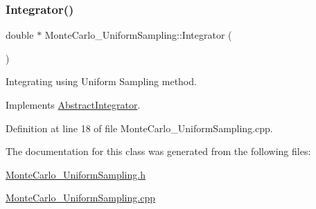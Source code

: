 \subsubsection{\texorpdfstring{Integrator()}{Integrator()}}
{\footnotesize\ttfamily double $\ast$ Monte\+Carlo\+\_\+\+Uniform\+Sampling\+::\+Integrator (\begin{DoxyParamCaption}{ }\end{DoxyParamCaption})\hspace{0.3cm}{\ttfamily [virtual]}}



Integrating using Uniform Sampling method. 



Implements \hyperlink{class_abstract_integrator_a073d8f87239f732b3d2832070caa3b17}{Abstract\+Integrator}.



Definition at line 18 of file Monte\+Carlo\+\_\+\+Uniform\+Sampling.\+cpp.



The documentation for this class was generated from the following files\+:\begin{DoxyCompactItemize}
\item 
\hyperlink{_monte_carlo___uniform_sampling_8h}{Monte\+Carlo\+\_\+\+Uniform\+Sampling.\+h}\item 
\hyperlink{_monte_carlo___uniform_sampling_8cpp}{Monte\+Carlo\+\_\+\+Uniform\+Sampling.\+cpp}\end{DoxyCompactItemize}
